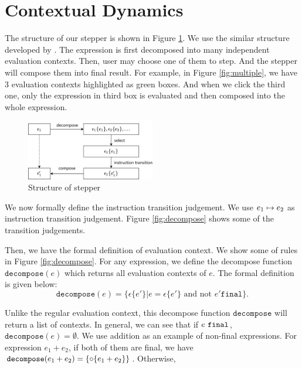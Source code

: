 \section{Contextual Dynamics}
\label{sec:condy}



The structure of our stepper is shown in Figure \ref{fig:structure}. We use the similar structure developed by \citet{cong_implementing_nodate}. The expression is first decomposed into many independent evaluation contexts. Then, user may choose one of them to step. And the stepper will compose them into final result. For example, in Figure \ref{fig:multiple}, we have 3 evaluation contexts highlighted as green boxes. And when we click the third one, only the expression in third box is evaluated and then composed into the whole expression.

\begin{figure}[htbp]
  \centering
  \includegraphics[width=0.5\textwidth]{img/struct.png}
  \caption{Structure of stepper}
  \label{fig:structure}
\end{figure}

We now formally define the instruction transition judgement. We use $e_1 \mapsto e_2$ as instruction transition judgement. Figure \ref{fig:decompose} shows some of the transition judgements.


Then, we have the formal definition of evaluation context. We show some of rules in Figure \ref{fig:decompose}. For any expression, we define the decompose function $\mathtt{decompose}(e)$ which returns all evaluation contexts of $e$. The formal definition is given below:
$$ \mathtt{decompose}(e) = \{ \epsilon\{e'\} | e = \epsilon\{e'\} \text{ and not } e' \mathtt{final} \}. $$

Unlike the regular evaluation context, this decompose function $\mathtt{decompose}$ will return a list of contexts. In general, we can see that if $e ~\mathtt{final}$, $\mathtt{decompose}(e) = \emptyset$. We use addition as an example of non-final expressions. For expression $e_1 + e_2$, if both of them are final, we have $\mathtt{decompose}(e_1 + e_2) = \{ \circ \{e_1+e_2\} \}$. Otherwise, 


